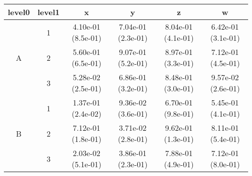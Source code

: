 \begin{tabular}{cccccc}
\toprule
level0 & level1&x&y&z&w\tabularnewline
\midrule
\multirow{3}{*}{A}&1& 4.10e-01 (8.5e-01)& 7.04e-01 (2.3e-01)& 8.04e-01 (4.1e-01)& 6.42e-01 (3.1e-01)\tabularnewline
&2& 5.60e-01 (6.5e-01)& 9.07e-01 (5.2e-01)& 8.97e-01 (3.3e-01)& 7.12e-01 (4.5e-01)\tabularnewline
&3& 5.28e-02 (2.5e-01)& 6.86e-01 (3.2e-01)& 8.48e-01 (3.0e-01)& 9.57e-02 (2.6e-01)\tabularnewline
\midrule
\multirow{3}{*}{B}&1& 1.37e-01 (2.4e-02)& 9.36e-02 (3.6e-01)& 6.70e-01 (9.8e-01)& 5.45e-01 (4.1e-01)\tabularnewline
&2& 7.12e-01 (1.8e-01)& 3.71e-02 (2.8e-01)& 9.62e-01 (1.3e-01)& 8.11e-01 (5.4e-01)\tabularnewline
&3& 2.03e-02 (5.1e-01)& 3.86e-01 (2.3e-01)& 7.88e-01 (4.9e-01)& 7.12e-01 (8.0e-01)\tabularnewline
\bottomrule
\end{tabular}
